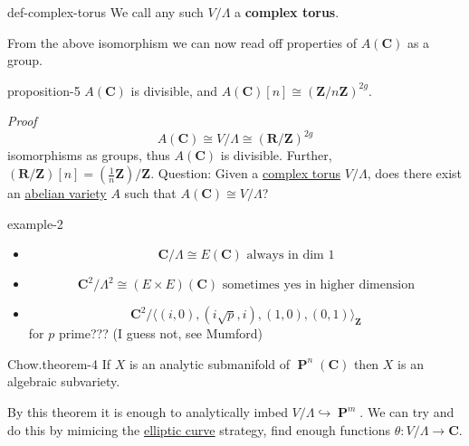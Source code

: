 \documentclass[10pt,]{book}
\makeatletter
\newcommand{\terminology}[1]{\textbf{#1}}
\renewcommand*{\proofname}{Proof}
\renewenvironment{proof}[1][\proofname]{\par
  \pushQED{\qed}%
  \normalfont \topsep6\p@\@plus6\p@\relax
  \trivlist
  \item\relax
    {\itshape
    #1\@addpunct{.}}\hspace\labelsep\ignorespaces
}{%
  \popQED\endtrivlist\@endpefalse
}
\numberwithin{equation}{section}
\newcommand{\lb}{[}
\newcommand{\rb}{]}
\newcommand{\ZZ}{\mathbf{Z}}
\newcommand{\RR}{\mathbf{R}}
\newcommand{\CC}{\mathbf{C}}
\DeclareMathOperator{\PP}{\mathbf{P}}
\makeatother
\begin{document}
\begin{definition}{}{def-complex-torus}%
\hypertarget{p-46}{}%
We call any such \(V/\Lambda\) a \terminology{complex torus}.%
\end{definition}
\hypertarget{p-47}{}%
From the above isomorphism we can now read off properties of \(A(\CC)\) as a group.%
\begin{proposition}{}{}{proposition-5}%
\hypertarget{p-48}{}%
\(A(\CC)\) is divisible, and \(A(\CC)\lb n\rb \cong (\ZZ/n\ZZ)^{2g}\).%
\end{proposition}
\begin{proof}\hypertarget{proof-9}{}
\hypertarget{p-49}{}%
%
\begin{equation*}
A(\CC)  \cong V/\Lambda \cong (\RR/\ZZ)^{2g}
\end{equation*}
isomorphisms as groups, thus \(A(\CC)\) is divisible. Further, \((\RR/\ZZ)\lb n \rb = (\frac 1n \ZZ)/\ZZ\).%
\end{proof}
\hypertarget{p-50}{}%
Question: Given a \hyperref[def-complex-torus]{complex torus} \(V/\Lambda\), does there exist an \hyperref[def-buntes-abvar]{abelian variety} \(A\) such that \(A(\CC) \cong V/\Lambda\)?%
\begin{example}{}{example-2}%
\hypertarget{p-51}{}%
\leavevmode%
\begin{itemize}[label=\textbullet]
\item{}%
\begin{equation*}
\CC/\Lambda \cong E(\CC) \text{ always in dim 1}
\end{equation*}
%
\item{}%
\begin{equation*}
\CC^2/\Lambda^2 \cong (E\times E)(\CC) \text{ sometimes yes in higher dimension}
\end{equation*}
%
\item{}%
\begin{equation*}
\CC^2/\langle (i, 0), (i\sqrt p, i), (1, 0), (0, 1)\rangle_\ZZ
\end{equation*}
for \(p\) prime??? (I guess not, see Mumford)%
\end{itemize}
%
\end{example}
\begin{theorem}{Chow.}{}{theorem-4}%
\hypertarget{p-52}{}%
If \(X\) is an analytic submanifold of \(\PP^n(\CC)\) then \(X\) is an algebraic subvariety.%
\end{theorem}
\hypertarget{p-53}{}%
By this theorem it is enough to analytically imbed \(V/\Lambda \hookrightarrow \PP^m\). We can try and do this by mimicing the \hyperref[def-supersing-isog-ec]{elliptic curve} strategy, find enough functions \(\theta \colon V/\Lambda \to \CC\).%
%
%
\typeout{************************************************}
\typeout{************************************************}
%
\end{document}
